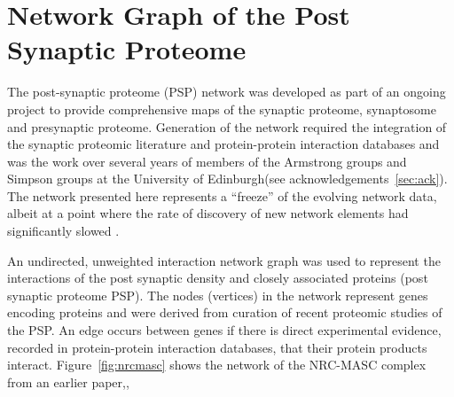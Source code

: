 \section{Network Graph of the Post Synaptic Proteome}
\label{sec:network graph generation}
The post-synaptic proteome (PSP) network was developed as part of an ongoing project to provide comprehensive maps of the synaptic proteome, synaptosome and presynaptic proteome. Generation of the network required the integration of the synaptic proteomic literature and protein-protein interaction databases and was the work over several years of members of the Armstrong groups and Simpson groups at the University of Edinburgh(see acknowledgements~\ref{sec:ack}). The network presented here represents a ``freeze'' of the evolving network data, albeit at a point where the rate of discovery of new network elements had significantly slowed \cite{heil2018systems}.

An undirected, unweighted interaction network graph was used to represent the interactions of the post synaptic density and closely associated proteins (post synaptic proteome PSP). The nodes (vertices) in the network represent genes encoding proteins and were derived from curation of recent proteomic studies of the PSP. An edge occurs between genes if there is direct experimental evidence, recorded in protein-protein interaction databases, that their protein products interact.  Figure~\ref{fig:nrcmasc} shows the network of the NRC-MASC complex from an earlier paper\cite{pocklington2006organization},\cite{mclean2016improved}, 

